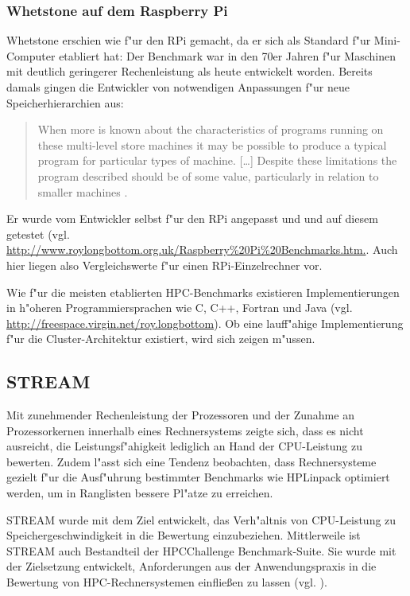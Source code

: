 \subsubsection{Whetstone auf dem Raspberry Pi}\label{Whetstone-RPi}

Whetstone erschien wie f"ur den RPi gemacht, da er sich als Standard f"ur Mini-Computer etabliert hat: Der Benchmark war in den 70er Jahren f"ur Maschinen mit deutlich geringerer Rechenleistung als heute entwickelt worden. Bereits damals gingen die Entwickler von notwendigen Anpassungen f"ur neue Speicherhierarchien aus: 
\begin{quote}
\onehalfspacing
When more is known about the characteristics of programs running on these multi-level store machines it may be possible to produce a typical program for particular types of machine. [\dots] Despite these limitations the program described should be of some value, particularly in relation to smaller machines \cite{cur76}. 
\end{quote}
Er wurde vom Entwickler selbst f"ur den RPi angepasst und und auf diesem getestet (vgl. \url{http://www.roylongbottom.org.uk/Raspberry\%20Pi\%20Benchmarks.htm.}. Auch hier liegen also Vergleichswerte f"ur einen RPi-Einzelrechner vor. 

Wie f"ur die meisten etablierten HPC-Benchmarks existieren Implementierungen in h"oheren Programmiersprachen wie C, C++, Fortran und Java (vgl. \url{http://freespace.virgin.net/roy.longbottom}). Ob eine lauff"ahige Implementierung f"ur die Cluster-Archi\-tektur existiert, wird sich zeigen m"ussen. 

\subsection{STREAM}\label{STREAM}

Mit zunehmender Rechenleistung der Prozessoren und der Zunahme an Prozessorkernen innerhalb eines Rechnersystems zeigte sich, dass es nicht ausreicht, die Leistungsf"ahigkeit lediglich an Hand der CPU-Leistung zu bewerten. Zudem l"asst sich eine Tendenz beobachten, dass Rechnersysteme gezielt f"ur die Ausf"uhrung bestimmter Benchmarks wie HPLinpack optimiert werden, um in Ranglisten bessere Pl"atze zu erreichen. 

STREAM wurde mit dem Ziel entwickelt, das Verh"altnis von CPU-Leistung zu Speichergeschwindigkeit in die Bewertung einzubeziehen. Mittlerweile ist STREAM auch Bestandteil der HPCChallenge Benchmark-Suite. Sie wurde mit der Zielsetzung entwickelt, Anforderungen aus der Anwendungspraxis in die Bewertung von HPC-Rechnersystemen einflie\ss en zu lassen (vgl. \cite{lus05}).

